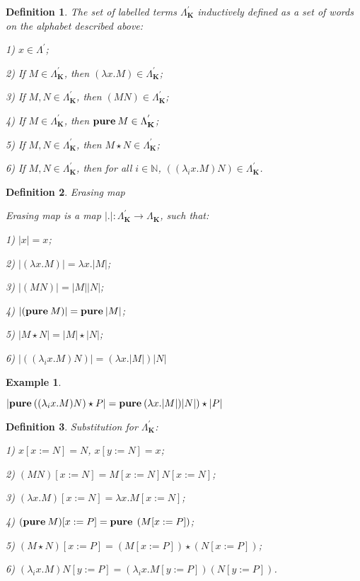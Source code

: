 \documentclass[a4paper]{article}
\newtheorem{defin}{Definition}
\newtheorem{ex}{Example}
\begin{document}
\begin{defin} The set of labelled terms $\Lambda^{'}_{\textbf{K}}$ inductively defined as a set of words on the alphabet
described above:

1) $x \in \Lambda^{'}$;

2) If $M \in \Lambda^{'}_{\textbf{K}}$, then $(\lambda x. M) \in \Lambda^{'}_{\textbf{K}}$;

3) If $M, N \in \Lambda^{'}_{\textbf{K}}$, then $(MN) \in \Lambda^{'}_{\textbf{K}}$;

4) If $M \in \Lambda^{'}_{\textbf{K}}$, then ${\bf pure \: } M \in \Lambda^{'}_{\textbf{K}}$;

5) If $M, N \in \Lambda^{'}_{\textbf{K}}$, then $M \star N \in \Lambda^{'}_{\textbf{K}}$;

6) If $M, N \in \Lambda^{'}_{\textbf{K}}$, then for all $i \in \mathbb{N}$, $((\lambda_i x. M) N) \in
\Lambda^{'}_{\textbf{K}}$.

\end{defin}

\begin{defin} Erasing map

Erasing map is a map $|.| : \Lambda^{'}_{\textbf{K}} \to \Lambda_{\textbf{K}}$, such that:

1) $|x| = x$;

2) $|(\lambda x. M)| = \lambda x. |M|$;

3) $|(M N)| = |M| |N|$;

4) $|({\bf pure \: } M)| = {\bf pure \: } |M|$;

5) $|M \star N| = |M| \star |N|$;

6) $|((\lambda_i x. M) N)| = (\lambda x. |M|) |N|$

\end{defin}

\begin{ex}

$ $

$|{\bf pure \: } ((\lambda_i x. M) N) \star P| = {\bf pure \: } (\lambda x. |M|) |N|) \star |P|$

\end{ex}

\begin{defin} Substitution for $\Lambda^{'}_{\textbf{K}}$:

1) $x [x := N] = N$, $x [y := N] = x$;

2) $(M N) [x := N] = M[x := N] N [x := N]$;

3) $(\lambda x. M) [x := N] = \lambda x. M [x := N]$;

4) $({\bf pure \: } M) [x := P] = {\bf pure \: } \: (M [x := P])$;

5) $(M \star N) [x := P] = (M [x := P]) \star (N [x := P])$;

6) $(\lambda_i x. M) N [y := P] = (\lambda_i x. M [y := P]) (N [y := P])$.

\end{defin}
\end{document}
